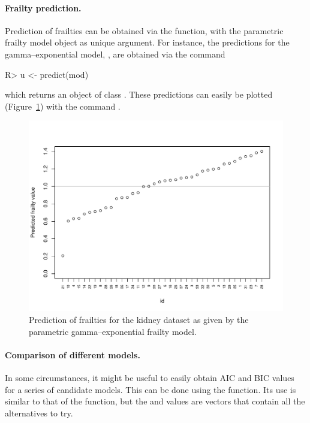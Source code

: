 \paragraph{Frailty prediction.}
Prediction of frailties can be obtained via the  function, with the parametric frailty model
  object as unique argument.
For instance, the predictions for the gamma--exponential model, , are obtained via the command
\begin{CodeChunk}
\begin{CodeInput}
R> u <- predict(mod)
\end{CodeInput}
\end{CodeChunk}
which returns an object of class .
These predictions can easily be plotted (Figure~\ref{fig:kidney.prediction}) with the command .
\begin{figure}[ht]
  \centering
  \includegraphics[width=.95\textwidth]{./graphs/prediplot.pdf}
  \caption{Prediction of frailties for the {kidney} dataset
    as given by the parametric gamma--exponential frailty model.}
  \label{fig:kidney.prediction}
\end{figure}


\paragraph{Comparison of different models.}
In some circumstances, it might be useful to easily obtain AIC and BIC values 
  for a series of candidate models. 
  This can be done using the  function.
Its use is similar to that of the  function,
  but the  and  values are vectors
  that contain all the alternatives to try.

